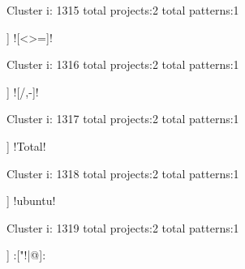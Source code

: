 Cluster i: 1315
total projects:2
total patterns:1
\begin{multicols}{1}
\begin{description}[noitemsep,topsep=0pt]
\item [[2] ] \cverb![<>=]!
\end{description}
\end{multicols}







Cluster i: 1316
total projects:2
total patterns:1
\begin{multicols}{1}
\begin{description}[noitemsep,topsep=0pt]
\item [[2] ] \cverb![/,-]!
\end{description}
\end{multicols}







Cluster i: 1317
total projects:2
total patterns:1
\begin{multicols}{1}
\begin{description}[noitemsep,topsep=0pt]
\item [[2] ] \cverb!Total!
\end{description}
\end{multicols}







Cluster i: 1318
total projects:2
total patterns:1
\begin{multicols}{1}
\begin{description}[noitemsep,topsep=0pt]
\item [[2] ] \cverb!ubuntu!
\end{description}
\end{multicols}







Cluster i: 1319
total projects:2
total patterns:1
\begin{multicols}{1}
\begin{description}[noitemsep,topsep=0pt]
\item [[2] ] \cverb:["!|@]:
\end{description}
\end{multicols}







